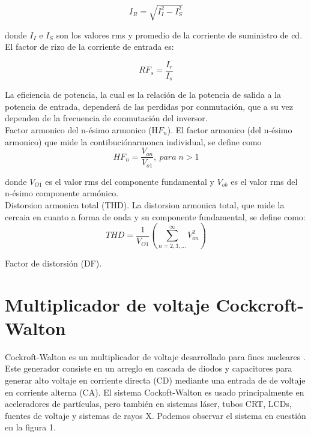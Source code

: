 \begin{equation}
I_{R}=\sqrt{I_{I}^{2}-I_{S}^{2}}
\end{equation}

donde $I_{I}$ e $I_{S}$ son los valores rms y promedio de la corriente de suministro de cd.
El factor de rizo de la corriente de entrada es: 

\begin{equation}
RF_{s}=\dfrac{I_{r}}{I_{s}}
\end{equation}

La eficiencia de potencia, la cual es la relación de la potencia de salida a la potencia de entrada, dependerá de las perdidas por conmutación, que a su vez dependen de la frecuencia de conmutación del inversor.\\

Factor armonico del n-ésimo armonico (H$F_{n}$). El factor armonico (del n-ésimo armonico) que mide la contibuciónarmonca individual, se define como \begin{equation}
HF_{n}=\dfrac{V_{on}}{V_{o1}}, \: para\; n>1
\end{equation}

donde $V_{O1}$ es el valor rms del componente fundamental y $V_{ob}$ es el valor rms del n-ésimo componente armónico.\\

Distorsion armonica total (THD). La distorsion armonica total, que mide la cercaia en cuanto a forma de onda y su componente fundamental, se define como: \begin{equation}
THD=\dfrac{1}{V_{O1}}\left( \sum_{n=2,3,...}^{\infty }V_{on}^{2}\right)
\end{equation}

Factor de distorsión (DF).
 
\newpage
\section{Multiplicador de voltaje Cockcroft-Walton}
Cockroft-Walton es un multiplicador de voltaje desarrollado para fines nucleares \cite{CERN}. Este generador consiste en un arreglo en cascada de diodos y capacitores para generar alto voltaje en corriente directa (CD) mediante una entrada de de voltaje en corriente alterna (CA). El sistema Cockoft-Walton es usado principalmente en aceleradores de partículas, pero también en sistemas láser, tubos CRT, LCDs, fuentes de voltaje y sistemas de rayos X. Podemos observar el sistema en cuestión en la figura 1.  

